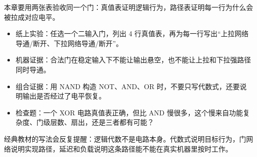 \begin{classicnote}
本章要用两张表验收同一个门：真值表证明逻辑行为，路径表证明每一行为什么会被拉成对应电平。

\begin{itemize}
\item 纸上实验：任选一个二输入门，列出 4 行真值表，再为每一行写出“上拉网络导通/断开、下拉网络导通/断开”。
\item 机器证据：合法门在稳定输入下不能让输出悬空，也不能让上拉和下拉强路径同时导通。
\item 组合证据：用 NAND 构造 NOT、AND、OR 时，不要只写代数式，还要说明输出是否经过了电平恢复。
\item 检查题：一个 XOR 电路真值表正确，但比 AND 慢很多，这个慢来自功能复杂度、门级层数、扇出，还是三者都有可能？
\end{itemize}

经典教材的写法会反复提醒：逻辑代数不是电路本身。代数式说明目标行为，门网络说明实现路径，延迟和负载说明这条路径能不能在真实机器里按时工作。
\end{classicnote}
